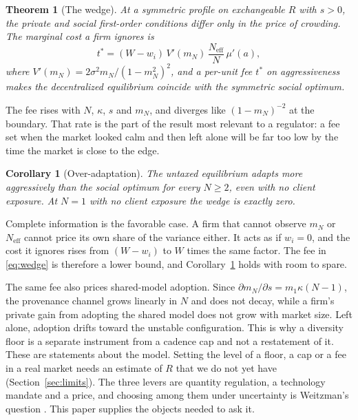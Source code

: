 \documentclass[conference]{IEEEtran}
\newtheorem{theorem}{Theorem}
\newtheorem{corollary}{Corollary}
\theoremstyle{definition}
\newcommand{\Neff}{N_{\mathrm{eff}}}
\begin{document}
\begin{theorem}[The wedge]\label{thm:wedge}
At a symmetric profile on exchangeable $R$ with $s > 0$, the private and
social first-order conditions differ only in the price of crowding. The
marginal cost a firm ignores is
\begin{equation}
  t^{*} = (W - w_i)\,V'(m_N)\,\frac{\Neff}{N}\,\mu'(a),
  \label{eq:wedge}
\end{equation}
where $V'(m_N) = 2\sigma^2 m_N/(1 - m_N^2)^2$, and a per-unit fee $t^{*}$ on
aggressiveness makes the decentralized equilibrium coincide with the symmetric
social optimum.
\end{theorem}

The fee rises with $N$, $\kappa$, $s$ and $m_N$, and diverges like
$(1 - m_N)^{-2}$ at the boundary. That rate is the part of the result most
relevant to a regulator: a fee set when the market looked calm and then left
alone will be far too low by the time the market is close to the edge.

\begin{corollary}[Over-adaptation]\label{cor:over}
The untaxed equilibrium adapts more aggressively than the social optimum for
every $N \ge 2$, even with no client exposure. At $N = 1$ with no client
exposure the wedge is exactly zero.
\end{corollary}

Complete information is the favorable case. A firm that cannot observe $m_N$
or $\Neff$ cannot price its own share of the variance either. It acts as if
$w_i = 0$, and the cost it ignores rises from $(W - w_i)$ to $W$ times the
same factor. The fee in \eqref{eq:wedge} is therefore a lower bound, and
Corollary~\ref{cor:over} holds with room to spare.

The same fee also prices shared-model adoption. Since
$\partial m_N/\partial s = m_1\kappa(N-1)$, the provenance channel grows
linearly in $N$ and does not decay, while a firm's private gain from adopting
the shared model does not grow with market size. Left alone, adoption drifts
toward the unstable configuration. This is why a diversity floor is a separate
instrument from a cadence cap and not a restatement of it. These are
statements about the model. Setting the level of a floor, a cap or a fee in a
real market needs an estimate of $R$ that we do not yet have
(Section~\ref{sec:limits}). The three levers are quantity regulation, a
technology mandate and a price, and choosing among them under uncertainty is
Weitzman's question \cite{weitzman1974}. This paper supplies the objects
needed to ask it.
\end{document}
